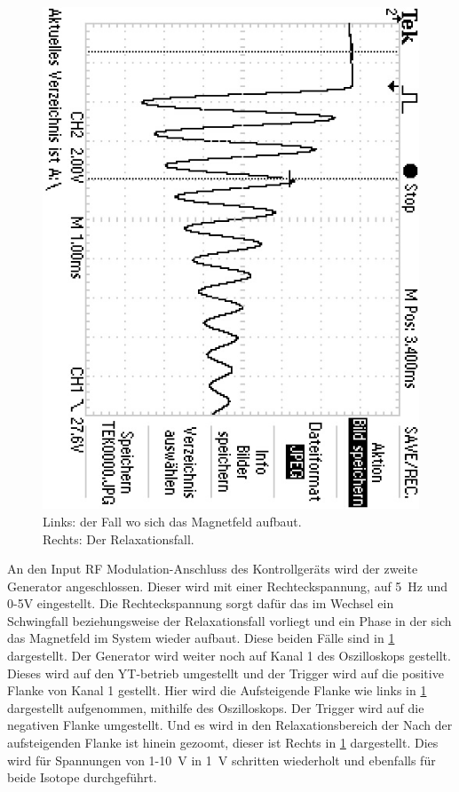 \begin{figure}[h!]
	\includegraphics[angle = 90, trim = 0.5cm 1.65cm 0.3cm 0cm, clip]{../Grafiken/Resonanz_1_Relaxation_4V.jpg}
	\caption{Links: der Fall wo sich das Magnetfeld aufbaut.\\ Rechts: Der Relaxationsfall.} \label{fig:Relaxation}
\end{figure}
An den Input RF Modulation-Anschluss des Kontrollgeräts wird der zweite Generator angeschlossen.
Dieser wird mit einer Rechteckspannung, auf \SI{5}{\hertz} und 0-5\si{\volt} eingestellt.
Die Rechteckspannung sorgt dafür das im Wechsel ein Schwingfall beziehungsweise der Relaxationsfall vorliegt und ein Phase in der sich das Magnetfeld im System wieder aufbaut. Diese beiden Fälle sind in \cref{fig:Relaxation} dargestellt.
Der Generator wird weiter noch auf Kanal 1 des Oszilloskops gestellt.
Dieses wird auf den YT-betrieb umgestellt und der Trigger wird auf die positive Flanke von Kanal 1 gestellt.
Hier wird die Aufsteigende Flanke wie links in \cref{fig:Relaxation} dargestellt aufgenommen, mithilfe des Oszilloskops.
Der Trigger wird auf die negativen Flanke umgestellt.
Und es wird in den Relaxationsbereich der Nach der aufsteigenden Flanke ist hinein gezoomt, dieser ist Rechts in \cref{fig:Relaxation} dargestellt.
Dies wird für Spannungen von 1-\SI{10}{\volt} in \SI{1}{\volt} schritten wiederholt und ebenfalls für beide Isotope durchgeführt.


